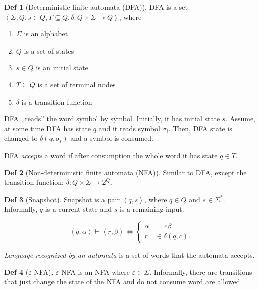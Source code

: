 \documentclass[a4paper]{article}
\theoremstyle{definition}
\newtheorem{definition}{Def}
\begin{document}
\begin{definition}[Deterministic finite automata (DFA)]
  DFA is a set \(\left< \Sigma, Q, s \in Q, T \subseteq Q, \delta : Q \times
  \Sigma \to Q\right>\), where
  \begin{enumerate}
    \item \(\Sigma\) is an alphabet
    \item \(Q\) is a set of states
    \item \(s \in Q\) is an initial state
    \item \(T \subseteq Q\) is a set of terminal nodes
    \item \(\delta\) is a transition function
  \end{enumerate}
\end{definition}

DFA ,,reads'' the word symbol by symbol.
Initially, it has initial state \(s\).
Assume, at some time DFA has state \(q\) and it reads symbol \(\sigma_i\).
Then, DFA state is changed to \(\delta(q, \sigma_i)\) and a symbol is consumed.

DFA \textit{accepts} a word if after consumption the whole word it has state
\(q \in T\).

\begin{definition}[Non-deterministic finite automata (NFA)]
  Similar to DFA, except the transition function:
  \(\delta : Q \times \Sigma \to 2^Q\).
\end{definition}

\begin{definition}[Snapshot]
  Snapshot is a pair \(\left<q, s\right>\), where \(q \in Q\) and \(s \in
  \Sigma^*\).
  Informally, \(q\) is a current state and \(s\) is a remaining input.
\end{definition}

\[
\left< q, \alpha \right> \vdash \left< r, \beta \right>
\iff
\begin{cases}
  \alpha &= c \beta \\
  r &\in \delta(q, c).
\end{cases}
\]

\textit{Language recognized by an automata}
is a set of words that the automata accepts.

\begin{definition}[\(\varepsilon\)-NFA]
  \(\varepsilon\)-NFA is an NFA where \(\varepsilon \in \Sigma\).
  Informally, there are transitions that just change the state of the NFA
  and do not consume word are allowed.
\end{definition}
\end{document}
